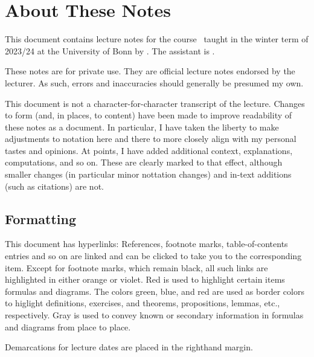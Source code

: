 \documentclass[wip, topology]{bsteffan-lecturenotes}
\subtitle{The Serre Spectral Sequence, Characteristic Classes, and Bordism}
\author{Ben Steffan}
\begin{document}
\frenchspacing 
\maketitle
\tableofcontents
\listoflectures

\setcounter{section}{-1}
\section*{About These Notes}
This document contains lecture notes for the course \makeatletter\@course\makeatother\ taught in the winter term of 2023/24 at the University of Bonn by \makeatletter\@lecturer\makeatother.
The assistant is \makeatletter\@assistant\makeatother.

These notes are for private use. 
They are  official lecture notes endorsed by the lecturer.
As such, errors and inaccuracies should generally be presumed my own. 

This document is not a character-for-character transcript of the lecture.
Changes to form (and, in places, to content) have been made to improve readability of these notes as a document.
In particular, I have taken the liberty to make adjustments to notation here and there to more closely align with my personal tastes and opinions.
At points, I have added additional context, explanations, computations, and so on.
These are clearly marked to that effect, although smaller changes (in particular minor nottation changes) and in-text additions (such as citations) are not.

\subsection*{Formatting}
This document has hyperlinks: References, footnote marks, table-of-contents entries and so on are linked and can be clicked to take you to the corresponding item.
Except for footnote marks, which remain black, all such links are highlighted in either \textcolor{linkcol}{orange} or \textcolor{citecol}{violet}. 
\textcolor{highlightcol}{Red} is used to highlight certain items formulas and diagrams.
The colors \textcolor{definitioncol}{green}, \textcolor{exercisecol}{blue}, and \textcolor{theoremcol}{red} are used as border colors to higlight definitions, exercises, and theorems, propositions, lemmas, etc., respectively.
\textcolor{knowngray}{Gray} is used to convey known or secondary information in formulas and diagrams from place to place.

Demarcations for lecture dates are placed in the righthand margin.











\printbibliography
\printindex
\end{document}
